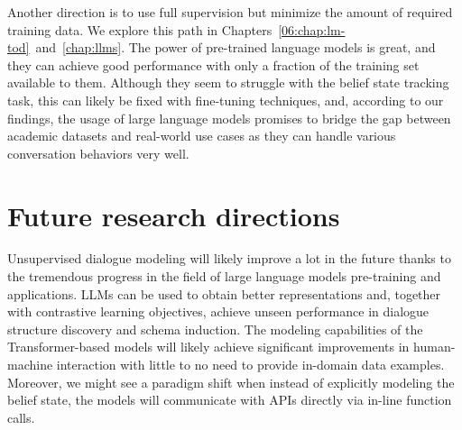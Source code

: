 Another direction is to use full supervision but minimize the amount of required training data.
We explore this path in Chapters~\ref{06:chap:lm-tod}~and~\ref{chap:llms}.
The power of pre-trained language models is great, and they can achieve good performance with only a fraction of the training set available to them.
Although they seem to struggle with the belief state tracking task, this can likely be fixed with fine-tuning techniques, and, according to our findings, the usage of large language models promises to bridge the gap between academic datasets and real-world use cases as they can handle various conversation behaviors very well. 

\section{Future research directions}
Unsupervised dialogue modeling will likely improve a lot in the future thanks to the tremendous progress in the field of large language models pre-training and applications.
LLMs can be used to obtain better representations and, together with contrastive learning objectives, achieve unseen performance in dialogue structure discovery and schema induction.
The modeling capabilities of the Transformer-based models will likely achieve significant improvements in human-machine interaction with little to no need to provide in-domain data examples.
Moreover, we might see a paradigm shift when instead of explicitly modeling the belief state, the models will communicate with APIs directly via in-line function calls.